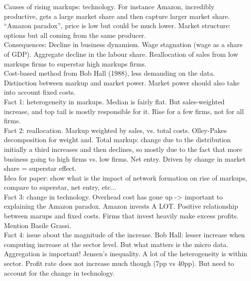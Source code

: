 \documentclass{amsart}
\theoremstyle{definition}
\theoremstyle{remark}
\numberwithin{equation}{section}
\begin{document}
Causes of rising markups: technology. For instance Amazon, incredibly productive, gets a large market share and then capture larger market share. ``Amazon paradox'', price is low but could be much lower. Market structure: options but all coming from the same producer.\\

Consequences: Decline in business dynamism. Wage stagnation (wage as a share of GDP). Aggregate decline in the labour share. Reallocation of sales from low markups firms to superstar high markups firms.\\

Cost-based method from Bob Hall (1988), less demanding on the data. \\

Distinction between markup and market power. Market power should also take into account fixed costs.\\

Fact 1: heterogeneity in markups. Median is fairly flat. But sales-weighted increase, and top tail is mostly responsible for it. Rise for a few firms, not for all firms.\\

Fact 2: reallocation. Markup weighted by sales, vs. total costs. Olley-Pakes decomposition for weight and. Total markup: change due to the distribution initially a third increases and then declines, so mostly due to the fact that more business going to high firms vs. low firms. Net entry. Driven by change in market share = superstar effect. \\

Idea for paper: show what is the impact of network formation on rise of markups, compare to superstar, net entry, etc...\\

Fact 3: change in technology. Overhead cost has gone up -> important to explaining the Amazon paradox. Amazon invests A LOT. Positive relationship between marups and fixed costs. Firms that invest heavily make excess profits.\\

Mention Basile Grassi.\\

Fact 4: issue about the magnitude of the increase. Bob Hall: lesser increase when computing increase at the sector level. But what matters is the micro data. Aggregation is important! Jensen's inequality. A lot of the heterogeneity is within sector. Profit rate does not increase much though (7pp vs 40pp). But need to account for the change in technology.\\
\end{document}
